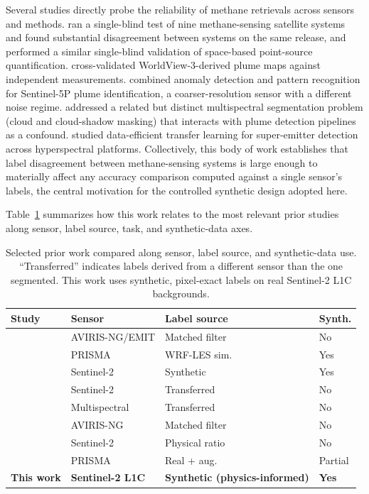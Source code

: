 \documentclass[10pt,twocolumn]{article}
\begin{document}
Several studies directly probe the reliability of methane retrievals across sensors and methods. \citet{varon2024singleblind} ran a single-blind test of nine methane-sensing satellite systems and found substantial disagreement between systems on the same release, and \citet{gorrono2023singleblind} performed a similar single-blind validation of space-based point-source quantification. \citet{irakulisloitxate2022worldview} cross-validated WorldView-3-derived plume maps against independent measurements. \citet{ouerghi2021detection} combined anomaly detection and pattern recognition for Sentinel-5P plume identification, a coarser-resolution sensor with a different noise regime. \citet{ulmer2025deep} addressed a related but distinct multispectral segmentation problem (cloud and cloud-shadow masking) that interacts with plume detection pipelines as a confound. \citet{maciasfauria2025transfer} studied data-efficient transfer learning for super-emitter detection across hyperspectral platforms. Collectively, this body of work establishes that label disagreement between methane-sensing systems is large enough to materially affect any accuracy comparison computed against a single sensor's labels, the central motivation for the controlled synthetic design adopted here.

Table~\ref{tab:related} summarizes how this work relates to the most relevant prior studies along sensor, label source, task, and synthetic-data axes.

\begin{table}[t]
\centering
\caption{Selected prior work compared along sensor, label source, and synthetic-data use. ``Transferred'' indicates labels derived from a different sensor than the one segmented. This work uses synthetic, pixel-exact labels on real Sentinel-2 L1C backgrounds.}
\label{tab:related}
\small
\begin{tabular}{p{}p{}p{}p{}}
\toprule
Study & Sensor & Label source & Synth.\\
\midrule
\citet{ruzicka2023starcop} & AVIRIS-NG/EMIT & Matched filter & No \\
\citet{joyce2023deep} & PRISMA & WRF-LES sim. & Yes \\
\citet{rodriguezcuenca2023synthetic} & Sentinel-2 & Synthetic & Yes \\
\citet{mateogarcia2023s2metnet} & Sentinel-2 & Transferred & No \\
\citet{sherwin2025plumebed} & Multispectral & Transferred & No \\
\citet{kumar2023methanemapper} & AVIRIS-NG & Matched filter & No \\
\citet{gorrono2024ch4net} & Sentinel-2 & Physical ratio & No \\
\citet{irakulisloitxate2022prisma} & PRISMA & Real + aug. & Partial \\
\midrule
\textbf{This work} & \textbf{Sentinel-2 L1C} & \textbf{Synthetic (physics-informed)} & \textbf{Yes} \\
\bottomrule
\end{tabular}
\end{table}
\end{document}
